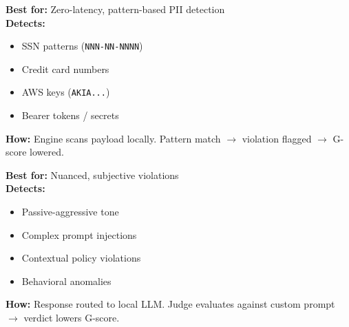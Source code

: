 \documentclass[11pt,a4paper]{article}
\begin{document}
\vspace{0.3cm}
\noindent
\begin{minipage}[t]{0.48\textwidth}
\begin{tcolorbox}[enhanced, colback=green!5!white, colframe=dpigreen, title={\textbf{\faCode\ Option A: Deterministic RegEx}}, fonttitle=\bfseries, boxrule=1.5pt, arc=2mm, bottom=0pt]
\textbf{Best for:} Zero-latency, pattern-based PII detection\\[0.2cm]
\textbf{Detects:}
\begin{itemize}
    \item[\textcolor{dpigreen}{\faAngleRight}] SSN patterns (\texttt{NNN-NN-NNNN})
    \item[\textcolor{dpigreen}{\faAngleRight}] Credit card numbers
    \item[\textcolor{dpigreen}{\faAngleRight}] AWS keys (\texttt{AKIA...})
    \item[\textcolor{dpigreen}{\faAngleRight}] Bearer tokens / secrets
\end{itemize}
\vspace{0.2cm}
\textbf{How:} Engine scans payload locally. Pattern match $\rightarrow$ violation flagged $\rightarrow$ G-score lowered.
\end{tcolorbox}
\end{minipage}
\hfill
\begin{minipage}[t]{0.48\textwidth}
\begin{tcolorbox}[enhanced, colback=purple!5!white, colframe=violet, title={\textbf{\faRobot\ Option B: LLM-as-a-Judge}}, fonttitle=\bfseries, boxrule=1.5pt, arc=2mm, bottom=0pt]
\textbf{Best for:} Nuanced, subjective violations\\[0.2cm]
\textbf{Detects:}
\begin{itemize}
    \item[\textcolor{violet}{\faAngleRight}] Passive-aggressive tone
    \item[\textcolor{violet}{\faAngleRight}] Complex prompt injections
    \item[\textcolor{violet}{\faAngleRight}] Contextual policy violations
    \item[\textcolor{violet}{\faAngleRight}] Behavioral anomalies
\end{itemize}
\vspace{0.2cm}
\textbf{How:} Response routed to local LLM. Judge evaluates against custom prompt $\rightarrow$ verdict lowers G-score.
\end{tcolorbox}
\end{minipage}
\end{document}
